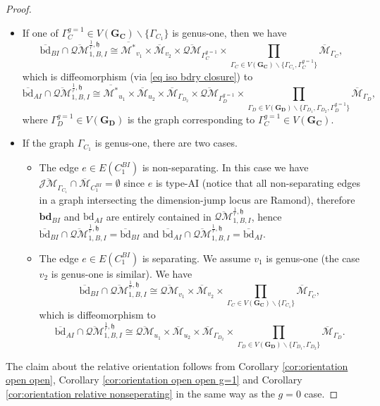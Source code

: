 \documentclass[11pt,a4paper]{article}
\theoremstyle{definition}
\theoremstyle{remark}
\newcommand{\oQMb}{{\overline{\mathcal{QM}}}}
\newcommand{\oJMb}{{\overline{\mathcal{JM}}}}
\numberwithin{equation}{section}
\def\Mbar{{\overline{\mathcal M}}}
\def\Mbarstar{{\overline{\mathcal M^*}}}
\def\h{{\mathfrak h}}
\begin{document}
\begin{proof}
\begin{itemize}
    \item 
    If one of $\Gamma_C^{g=1}\in V(\mathbf{G_C})\backslash \{\Gamma_{C_1}\}$ is genus-one, then we have 
\begin{equation*}
\overline{\text{bd}}_{BI} \cap \oQMb^{\frac{1}{r},\h}_{1,B,I}\cong \Mbarstar_{v_1}\times\Mbar_{v_2}\times \oQMb_{\Gamma_C^{g=1}}\times\prod_{\Gamma_C\in V(\mathbf{G_C})\backslash \{\Gamma_{C_1},\Gamma_C^{g=1}\}}\Mbar_{\Gamma_C},
\end{equation*}
which is diffeomorphism (via \eqref{eq iso bdry closure}) to \begin{equation*}
\overline{\text{bd}}_{AI}\cap\oQMb^{\frac{1}{r},\h}_{1,B,I}\cong \Mbarstar_{u_1}\times \Mbar_{u_2}\times\Mbar_{\Gamma_{D_2}}\times \oQMb_{\Gamma_D^{g=1}}\times\prod_{\Gamma_D\in V(\mathbf{G_D})\backslash \{\Gamma_{D_1},\Gamma_{D_2},\Gamma_D^{g=1}\}}\Mbar_{\Gamma_D},
\end{equation*}
where $\Gamma_D^{g=1}\in V(\mathbf{G_D})$ is the graph corresponding to $\Gamma_C^{g=1}\in V(\mathbf{G_C})$.
\item If the graph $\Gamma_{C_1}$ is genus-one, there are two cases.
\begin{itemize}
    \item The edge $e\in E(C^{BI}_1)$ is non-separating. In this case we have $\oJMb_{\Gamma_{C_1}}\cap \Mbar_{C^{BI}_1}=\emptyset$ since $e$ is type-AI (notice that all non-separating edges in a  graph intersecting the dimension-jump locus are Ramond), therefore $\textbf{bd}_{BI}$ and $\text{bd}_{AI}$ are entirely contained in $ \oQMb^{\frac{1}{r},\h}_{1,B,I}$, hence $\overline{\text{bd}}_{BI}\cap \oQMb^{\frac{1}{r},\h}_{1,B,I}=\overline{\text{bd}}_{BI}$ and $\overline{\text{bd}}_{AI}\cap \oQMb^{\frac{1}{r},\h}_{1,B,I}=\overline{\text{bd}}_{AI}$.
    \item The edge $e\in E(C^{BI}_1)$ is separating. We assume $v_1$ is genus-one (the case $v_2$ is genus-one is similar). We have 
    \begin{equation*}
    \overline{\text{bd}}_{BI}\cap\oQMb^{\frac{1}{r},\h}_{1,B,I}\cong \oQMb_{v_1}\times\Mbar_{v_2}\times\prod_{\Gamma_C\in V(\mathbf{G_C})\backslash \{\Gamma_{C_1}\}}\Mbar_{\Gamma_C},
    \end{equation*}
which is diffeomorphism to 
\begin{equation*}
\overline{\text{bd}}_{AI}\cap\oQMb^{\frac{1}{r},\h}_{1,B,I}\cong \oQMb_{u_1}\times \Mbar_{u_2}\times\Mbar_{\Gamma_{D_2}}\times\prod_{\Gamma_D\in V(\mathbf{G_D})\backslash \{\Gamma_{D_1},\Gamma_{D_2}\}}\Mbar_{\Gamma_D}.
\end{equation*}
\end{itemize}

\end{itemize}

The claim about the relative orientation follows from Corollary \ref{cor:orientation open open}, Corollary \ref{cor:orientation open open g=1} and Corollary \ref{cor:orientation relative nonseperating} in the same way as the $g=0$ case.


\end{proof}
\end{document}
